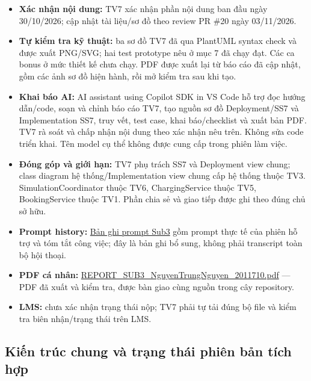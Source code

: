 \documentclass[11pt,a4paper]{article}
\providecommand{\tightlist}{%
  \setlength{\itemsep}{0pt}\setlength{\parskip}{0pt}}
\begin{document}
\begin{itemize}
\tightlist
\item
  \textbf{Xác nhận nội dung:} TV7 xác nhận phần nội dung ban đầu ngày
  30/10/2026; cập nhật tài liệu/sơ đồ theo review PR \#20 ngày
  03/11/2026.
\item
  \textbf{Tự kiểm tra kỹ thuật:} ba sơ đồ TV7 đã qua PlantUML syntax
  check và được xuất PNG/SVG; hai test prototype nêu ở mục 7 đã chạy
  đạt. Các ca bonus ở mức thiết kế chưa chạy. PDF được xuất lại từ báo
  cáo đã cập nhật, gồm các ảnh sơ đồ hiện hành, rồi mở kiểm tra sau khi
  tạo.
\item
  \textbf{Khai báo AI:} AI assistant using Copilot SDK in VS Code hỗ trợ
  đọc hướng dẫn/code, soạn và chỉnh báo cáo TV7, tạo nguồn sơ đồ
  Deployment/SS7 và Implementation SS7, truy vết, test case, khai
  báo/checklist và xuất bản PDF. TV7 rà soát và chấp nhận nội dung theo
  xác nhận nêu trên. Không sửa code triển khai. Tên model cụ thể không
  được cung cấp trong phiên làm việc.
\item
  \textbf{Đóng góp và giới hạn:} TV7 phụ trách SS7 và Deployment view
  chung; class diagram hệ thống/Implementation view chung cấp hệ thống
  thuộc TV3. SimulationCoordinator thuộc TV6, ChargingService thuộc TV5,
  BookingService thuộc TV1. Phần chia sẻ và giao tiếp được ghi theo đúng
  chủ sở hữu.
\item
  \textbf{Prompt history:}
  \href{../../../prompt-history/TV7_NguyenTrungNguyen/prompt_history_NguyenTrungNguyen_sub3.txt}{Bản
  ghi prompt Sub3} gồm prompt thực tế của phiên hỗ trợ và tóm tắt công
  việc; đây là bản ghi bổ sung, không phải transcript toàn bộ hội thoại.
\item
  \textbf{PDF cá nhân:}
  \href{../../../../output/submission_3/REPORT_SUB3_NguyenTrungNguyen_2011710.pdf}{REPORT\_SUB3\_NguyenTrungNguyen\_2011710.pdf}
  --- PDF đã xuất và kiểm tra, được bàn giao cùng nguồn trong cây
  repository.
\item
  \textbf{LMS:} chưa xác nhận trạng thái nộp; TV7 phải tự tải đúng bộ
  file và kiểm tra biên nhận/trạng thái trên LMS.
\end{itemize}

\hypertarget{kiux1ebfn-truxfac-chung-vuxe0-trux1ea1ng-thuxe1i-phiuxean-bux1ea3n-tuxedch-hux1ee3p}{%
\subsection{Kiến trúc chung và trạng thái phiên bản tích
hợp}\label{kiux1ebfn-truxfac-chung-vuxe0-trux1ea1ng-thuxe1i-phiuxean-bux1ea3n-tuxedch-hux1ee3p}}
\end{document}
